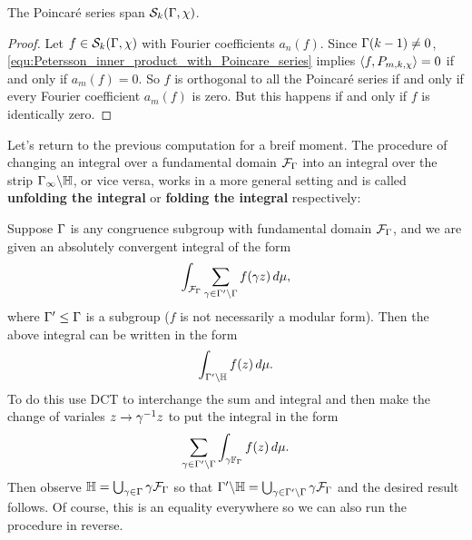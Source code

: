       \begin{theorem}
        The Poincar\'e series span $\mathcal{S}_{k}(\Gamma,\chi)$.
      \end{theorem}
      \begin{proof}
        Let $f \in \mathcal{S}_{k}(\Gamma,\chi)$ with Fourier coefficients $a_{n}(f)$. Since $\Gamma(k-1) \neq 0$, \cref{equ:Petersson_inner_product_with_Poincare_series} implies $\langle f,P_{m,k,\chi}\rangle = 0$ if and only if $a_{m}(f) = 0$. So $f$ is orthogonal to all the Poincar\'e series if and only if every Fourier coefficient $a_{m}(f)$ is zero. But this happens if and only if $f$ is identically zero.
      \end{proof}

      Let's return to the previous computation for a breif moment. The procedure of changing an integral over a fundamental domain $\mathcal{F}_{\Gamma}$ into an integral over the strip $\Gamma_{\infty}\backslash\mathbb{H}$, or vice versa, works in a more general setting and is called \textbf{unfolding the integral} or \textbf{folding the integral} respectively:

      \begin{method}
        Suppose $\Gamma$ is any congruence subgroup with fundamental domain $\mathcal{F}_{\Gamma}$, and we are given an absolutely convergent integral of the form
        \[
          \int_{\mathcal{F}_{\Gamma}}\sum_{\gamma \in \Gamma'\backslash\Gamma}f(\gamma z)\,d\mu,
        \]
        where $\Gamma' \le \Gamma$ is a subgroup ($f$ is not necessarily a modular form). Then the above integral can be written in the form
        \[
          \int_{\Gamma'\backslash\mathbb{H}}f(z)\,d\mu.
        \]
        To do this use DCT to interchange the sum and integral and then make the change of variales $z \to \gamma^{-1}z$ to put the integral in the form
        \[
          \sum_{\gamma \in \Gamma'\backslash\Gamma}\int_{\gamma\mathbb{F}_{\Gamma}}f(z)\,d\mu.
        \]
        Then observe $\mathbb{H} = \bigcup_{\gamma \in \Gamma}\gamma\mathcal{F}_{\Gamma}$ so that $\Gamma'\backslash\mathbb{H} = \bigcup_{\gamma \in \Gamma'\backslash\Gamma}\gamma\mathcal{F}_{\Gamma}$ and the desired result follows. Of course, this is an equality everywhere so we can also run the procedure in reverse.
      \end{method}

